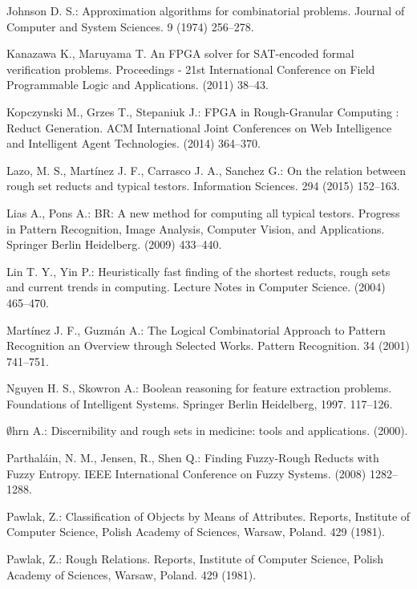 \documentclass[11pt]{article}   %
\begin{document}
\begin{thebibliography}{}
	Johnson D. S.:
	Approximation algorithms for combinatorial problems. 
	Journal of Computer and System Sciences. 9 (1974) 256--278.

	Kanazawa K., Maruyama T.
	An FPGA solver for SAT-encoded formal verification problems. 
	Proceedings - 21st International Conference on Field Programmable Logic and Applications. (2011) 38--43.

	Kopczynski M., Grzes T., Stepaniuk J.:
	FPGA in Rough-Granular Computing : Reduct Generation.
	ACM International Joint Conferences on Web Intelligence and Intelligent Agent Technologies. (2014) 364--370. 

	Lazo, M. S., Martínez J. F., Carrasco J. A., Sanchez G.:
	On the relation between rough set reducts and typical testors.
	Information Sciences. 294 (2015) 152--163.

	 Lias A., Pons A.:
	 BR: A new method for computing all typical testors.
	 Progress in Pattern Recognition, Image Analysis, Computer Vision, and Applications. 
	 Springer Berlin Heidelberg. (2009) 433--440.	
	 
	 Lin T. Y., Yin P.:
	 Heuristically fast finding of the shortest reducts, rough sets and current trends in computing.
	 Lecture Notes in Computer Science. (2004) 465--470.
	
	Mart\'inez J. F., Guzm\'an A.:
	The Logical Combinatorial Approach to Pattern Recognition an Overview through Selected Works. 
	Pattern Recognition. 34 (2001) 741--751.

	Nguyen H. S., Skowron A.:
	Boolean reasoning for feature extraction problems.
	Foundations of Intelligent Systems. Springer Berlin Heidelberg, 1997. 117--126.	
	
	$\emptyset$hrn A.:
	Discernibility and rough sets in medicine: tools and applications. (2000).	
	 
	Parthaláin, N. M., Jensen, R., Shen Q.:
	Finding Fuzzy-Rough Reducts with Fuzzy Entropy.
	IEEE International Conference on Fuzzy Systems. (2008) 1282--1288.
	
	Pawlak, Z.: 
	Classification of Objects by Means of Attributes.
	Reports, Institute of Computer Science, Polish Academy of Sciences, Warsaw, Poland. 429 (1981).

	Pawlak, Z.:
	Rough Relations.
	Reports, Institute of Computer Science, Polish Academy of Sciences, Warsaw, Poland. 429 (1981).


\end{thebibliography}
\end{document}
